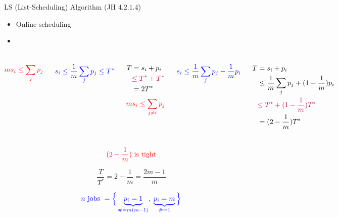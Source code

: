 \begin{frame}
  \begin{exampleblock}{LS (List-Scheduling) Algorithm (JH $4.2.1.4$)}
	\begin{itemize}
	  \item Online scheduling
	  \item {}
	\end{itemize}
  \end{exampleblock}

  \pause
  \begin{columns}
	  \[
		\textcolor{red}{ms_i \le \sum_{j} p_j} 
	  \]

	  \[
		\textcolor{blue}{s_i \le \frac{1}{m} \sum_{j} p_j \le T^{\ast}}
	  \]

	  \pause
	  \begin{align*}
		T &= s_i + p_i \\
		  &\textcolor{purple}{\le T^{\ast} + T^{\ast}} \\
		  &= 2T^{\ast}
	  \end{align*}
	  \pause
	  \[
		\textcolor{red}{ms_i \le \sum_{\textcolor{red}{j \neq i}} p_j} 
	  \]

	  \[
		\textcolor{blue}{s_i \le \frac{1}{m} \sum_{j} p_j - \frac{1}{m} p_{i}}
	  \]

	  \pause
	  \begin{align*}
		T &= s_i + p_i \\
		&\le \frac{1}{m} \sum_{j} p_j + (1 - \frac{1}{m}) p_{i} \\
		&\textcolor{purple}{\le T^{\ast} + (1 - \frac{1}{m}) T^{\ast}} \\
		&= (2 - \frac{1}{m}) T^{\ast}
	  \end{align*}
  \end{columns}
\end{frame}

\begin{frame}
  \[
	\textcolor{red}{\text{$(2-\frac{1}{m})$ is tight}}
  \]

  \pause
  \vspace{0.30cm}
  \[
	\frac{T}{T^{\ast}} = 2 - \frac{1}{m} = \frac{2m - 1}{m}
  \]

  \pause
  \vspace{0.30cm}
  \[
	\textcolor{blue}{n \text{ jobs } = \Big\{ \underbrace{p_i = 1}_{\# = m(m - 1)},\; \underbrace{p_i = m}_{\# = 1} \Big\}}
  \]
\end{frame}

